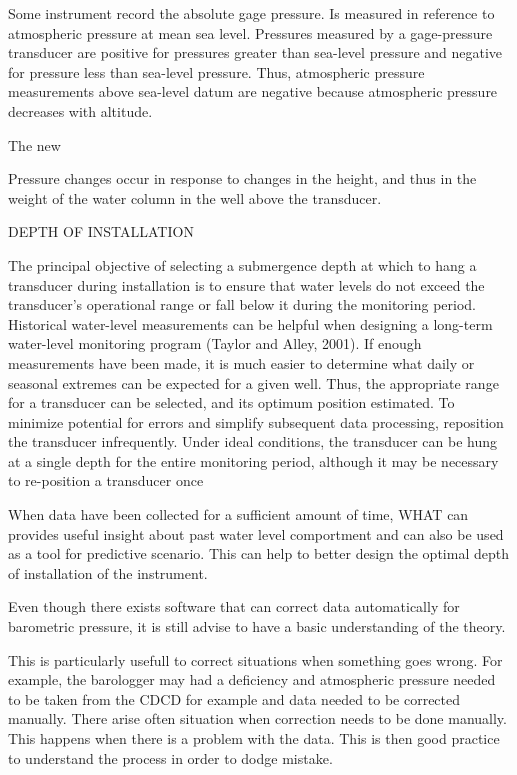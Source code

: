 \documentclass[12pt, letterpaper, fleqn]{report}
\begin{document}
Some instrument record the absolute gage pressure. Is measured in reference to atmospheric pressure at mean sea level. Pressures measured by a gage-pressure transducer are positive for pressures greater than sea-level pressure and negative for pressure less than sea-level pressure. Thus, atmospheric pressure measurements above sea-level datum are negative because atmospheric pressure decreases with altitude.

The new

Pressure changes occur in response to changes in the height, and thus in the weight of the water column in the well above the transducer.

DEPTH OF INSTALLATION

The principal objective of selecting a submergence depth at which to hang a transducer during installation is to ensure that water levels do not exceed the transducer’s operational range or fall below it during the monitoring period. Historical water-level measurements can be helpful when designing a long-term water-level monitoring program (Taylor and Alley, 2001). If enough measurements have been made, it is much easier to determine what daily or seasonal extremes can be expected for a given well. Thus, the appropriate range for a transducer can be selected, and its optimum position estimated. To minimize potential for errors and simplify subsequent data processing, reposition the transducer infrequently. Under ideal conditions, the transducer can be hung at a single depth for the entire monitoring period, although it may be necessary to re-position a transducer once

When data have been collected for a sufficient amount of time, WHAT can provides useful insight about past water level comportment and can also be used as a tool for predictive scenario. This can help to better design the optimal depth of installation of the instrument.
 
Even though there exists software that can correct data automatically for barometric pressure, it is still advise to have a basic understanding of the theory.

This is particularly usefull to correct situations when something goes wrong. For example, the barologger may had a deficiency and atmospheric pressure needed to be taken from the CDCD for example and data needed to be corrected manually. There arise often situation when correction needs to be done manually. This happens when there is a problem with the data. This is then good practice to understand the process in order to dodge mistake.
\end{document}
